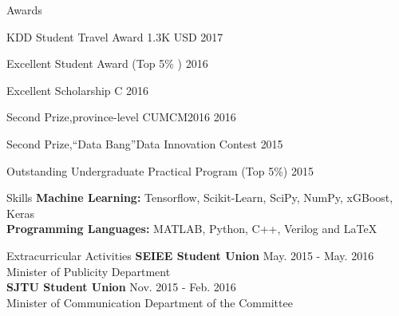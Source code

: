 \documentclass{resume} %
\begin{document}

\begin{rSection}{Awards}
\begin{rSubsection}{}{}{}{}
\item KDD Student Travel Award \hfill{1.3K USD 2017}
\item Excellent Student Award (Top 5\% )  \hfill{2016}
\item Excellent Scholarship C \hfill{2016}
\item Second Prize,province-level CUMCM2016 \hfill{2016}
\item Second Prize,``Data Bang''Data Innovation Contest \hfill{2015} 
\item Outstanding Undergraduate Practical Program (Top 5\%) \hfill{2015}
\end{rSubsection}
\end{rSection}

\begin{rSection}{Skills}
{\bf Machine Learning: }
\hspace*{3.0 cm} Tensorflow, Scikit-Learn, SciPy, NumPy, xGBoost, Keras\\
{\bf Programming Languages: }
\hspace*{1.8 cm} MATLAB, Python, C++, Verilog and \LaTeX  \\
\end{rSection}
\begin{rSection}{Extracurricular Activities}
\textbf{SEIEE Student Union} \hfill{May. 2015 - May. 2016}\\
Minister of Publicity Department  \\
\textbf{SJTU Student Union} \hfill{Nov. 2015 - Feb. 2016}\\
Minister of Communication Department of the Committee 
\end{rSection}
\clearpage
\end{document}
